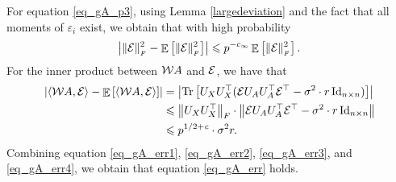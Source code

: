 	For equation \eqref{eq_gA_p3}, using Lemma \ref{largedeviation} and the fact that all moments of $\varepsilon_i$ exist, we obtain that with high probability
	\begin{align}
		\left\lvert\|\mathcal{E}\|_{_{F}}^2 - \mathop{\mathbb{E}}\left[ \|\mathcal{E}\|_{_{F}}^2 \right]\right\rvert \leqslant p^{-c_{\infty}} \mathop{\mathbb{E}}\left[ \|\mathcal{E}\|_{_{F}}^2 \right]. \label{eq_gA_err3}
	\end{align}
	For the inner product between ${\mathcal W} A$ and $\mathcal{E}$, we have that
	\begin{align}
		{\left| {\langle {\mathcal W}A, \mathcal{E}\rangle - \mathop{\mathbb{E}}\left[ \langle {\mathcal W}A, \mathcal{E}\rangle \right]} \right|} &= {\left| {\operatorname{Tr}\left[U_X U_X^{\top} (\mathcal{E} U_AU_A^{\top} \mathcal{E}^{\top} - \sigma^2 \cdot r \operatorname{Id}_{n\times n})\right]} \right|} \nonumber  \\
		&\leqslant \left\| U_{X} U_X^{\top} \right\|_{F} \cdot \left\| \mathcal{E} U_A U_A^{\top} \mathcal{E}^{\top} - \sigma^2 \cdot r \operatorname{Id}_{n\times n} \right\| \nonumber \\
		&\leqslant p^{1/2 + {\mathit{c}}} \cdot \sigma^2 r. \label{eq_gA_err4}
	\end{align}
	Combining equation \eqref{eq_gA_err1}, \eqref{eq_gA_err2}, \eqref{eq_gA_err3}, and \eqref{eq_gA_err4}, we obtain that equation \eqref{eq_gA_err} holds.

